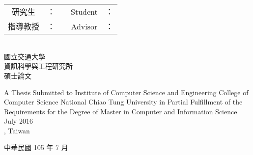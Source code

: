 \begin{titlepage}
  \begin{center}
    \LARGE \chineseTitle{}  \\
    \LARGE \englishTitle{}  \\[1.5cm]
  
    \Large
    \begin{tabular}{c l c c l}
    研究生   & ：\studentCnName{} & \hspace{3cm}  & Student  & ：\studentEnName{} \\
    指導教授 & ：\advisorCnName{} & \hspace{3cm}  & Advisor  & ：\advisorEnName{}\\
    \end{tabular}
    \\[1.5cm]
    國立交通大學 \\
    資訊科學與工程研究所 \\
    碩士論文 \\[1cm]
	
    \begin{singlespace}
    A Thesis Submitted to Institute of Computer Science and Engineering College of Computer Science National Chiao Tung University in Partial Fulfillment of the Requirements for the Degree of Master in Computer and Information Science \\
    July 2016 \\
    \studentEnName{}, Taiwan \\
    \end{singlespace}

  \end{center}

  \vspace{\fill}

  \begin{center}
    {\LARGE 中華民國  105 年 7 月}
  \end{center}
\end{titlepage}